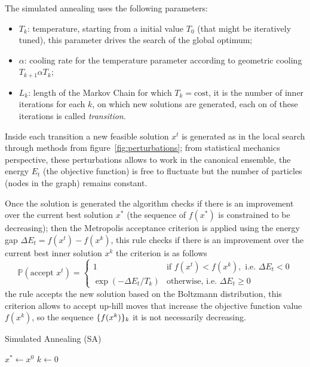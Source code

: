 The simulated annealing uses the following parameters:
\begin{itemize}
	\item $T_k$: temperature, starting from a initial value $T_0$ (that might be iteratively tuned), this parameter drives the search of the global optimum;
	\item $\alpha$: cooling rate for the temperature parameter according to geometric cooling $T_{k+1}\alpha T_k$;
	\item $L_k$: length of the Markov Chain for which $T_k=\text{cost}$, it is the number of inner iterations for each $k$, on which new solutions are generated, each on of these iterations is called \emph{transition}.
\end{itemize}

Inside each transition a new feasible solution $x^t$ is generated as in the local search through methods from figure~\vref{fig:perturbations}; from statistical mechanics perspective, these perturbations allows to work in the canonical ensemble, the energy $E_t$ (the objective function) is free to fluctuate but the number of particles (nodes in the graph) remains constant.

Once the solution is generated the algorithm checks if there is an improvement over the current best solution $x^\ast$ (the sequence of $f(x^\ast)$ is constrained to be decreasing); then the Metropolis acceptance criterion is applied using the energy gap $\Delta E_t=f(x^t)-f(x^k)$, this rule checks if there is an improvement over the current best inner solution $x^k$ the criterion is as follows
\[
\mathbb{P}(\text{accept $x^t$})=
\begin{cases}
	1 & \text{if $f(x^t)<f(x^k), \text{ i.e. } \Delta E_t<0$} \\
	\exp(-\Delta E_t/T_k) & \text{otherwise, i.e. $\Delta E_t\geq0$}
\end{cases}
\]
the rule accepts the new solution based on the Boltzmann distribution, this criterion allows to accept up-hill moves that increase the objective function value $f(x^k)$, so the sequence $\{f(x^k)\}_k$ it is not necessarily decreasing.

\begin{algorithm}\caption{Simulated Annealing (SA)}\label{alg:sim-ann}
	$x^\ast\gets x^0$\;
	$k\gets0$\;
\end{algorithm}

